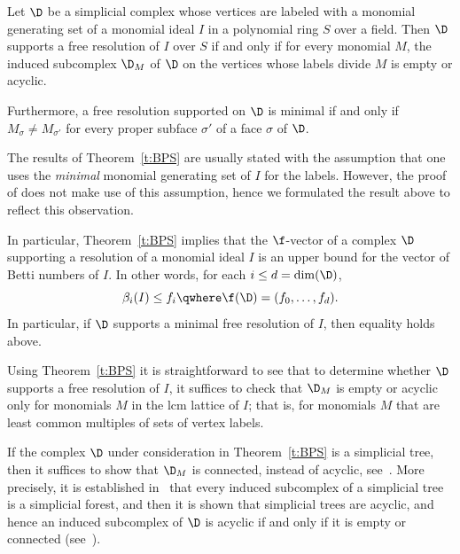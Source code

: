 \begin{theorem}\label{t:BPS}
          Let $\D$ be a simplicial complex whose vertices are labeled
          with a monomial generating set of a monomial ideal
          $I$  in a polynomial ring $S$ over a field.
          Then $\D$ supports a free resolution of $I$ over $S$ if and
          only if for every monomial $M$, the induced subcomplex
          $\D_M$ of $\D$ on the vertices whose labels divide $M$ is
          empty or acyclic.

Furthermore, a free resolution supported on $\D$ is
                minimal if and only if $M_{\sigma} \neq M_{\sigma'}$
                for every proper subface $\sigma'$ of a face $\sigma$
                of $\D$.
\end{theorem} 

\begin{rema}
The results of Theorem~\ref{t:BPS} are usually stated with the assumption that one uses the {\it minimal} monomial generating set of $I$ for the labels.  However, the proof of \cite[Lemma 2.2]{BPS} does not make use of this assumption, hence we formulated the result above to reflect this observation. 
\end{rema}


In particular, Theorem~\ref{t:BPS}  implies that the $\f$-vector of a
complex $\D$ supporting a resolution of a monomial ideal $I$ is an
upper bound for the vector of Betti numbers of $I$. In other words,
for each $i \leq d=\dim(\D)$,
$$\beta_i(I)\leq f_{i} \qwhere \f(\D)=(f_0,\ldots,f_d).$$ In
particular, if $\D$ supports a minimal free resolution of $I$, then
equality holds above.

Using Theorem~\ref{t:BPS} it is straightforward to see that to
determine whether $\D$ supports a free resolution of $I$, it suffices
to check that $\D_M$ is empty or acyclic only for monomials $M$ in the
lcm lattice of $I$; that is, for monomials $M$ that are least common
multiples of sets of vertex labels.


If the complex $\D$ under consideration in Theorem~\ref{t:BPS} is a
simplicial tree, then it suffices to show that $\D_M$ is connected, instead of acyclic, see~\cite{F14}.  More precisely, it is established in~\cite{F14} that
every induced subcomplex of a simplicial tree is  a simplicial
forest, and then it is shown that simplicial trees are acyclic, and hence an induced subcomplex of $\D$ is acyclic if and only if  it is empty or connected \textup{(}see~\cite[Theorems~2.5, 2.9, 3.2]{F14}\textup{)}.



